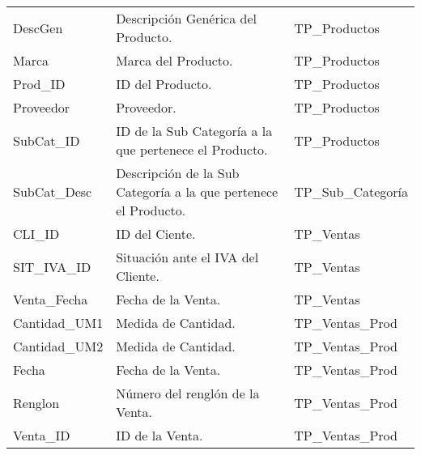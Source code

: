 \documentclass[]{article}
\begin{document}
\begin{itemize}
\begin{table}[]
\begin{tabular}{lll}
				DescGen                                & Descripción Genérica del Producto.                              & TP\_Productos                             \\
				Marca                                  & Marca del Producto.                                             & TP\_Productos                             \\
				Prod\_ID                               & ID del Producto.                                                & TP\_Productos                             \\
				Proveedor                              & Proveedor.                                                      & TP\_Productos                             \\
				SubCat\_ID                             & ID de la Sub Categoría a la que pertenece el Producto.          & TP\_Productos                             \\
				SubCat\_Desc                           & Descripción de la Sub Categoría a la que pertenece el Producto. & TP\_Sub\_Categoría                        \\
				CLI\_ID                                & ID del Ciente.                                                  & TP\_Ventas                                \\
				SIT\_IVA\_ID                           & Situación ante el IVA del Cliente.                              & TP\_Ventas                                \\
				Venta\_Fecha                           & Fecha de la Venta.                                              & TP\_Ventas                                \\
				Cantidad\_UM1                          & Medida de Cantidad.                                             & TP\_Ventas\_Prod                          \\
				Cantidad\_UM2                          & Medida de Cantidad.                                             & TP\_Ventas\_Prod                          \\
				Fecha                                  & Fecha de la Venta.                                              & TP\_Ventas\_Prod                          \\
				Renglon                                & Número del renglón de la Venta.                                 & TP\_Ventas\_Prod                          \\
				Venta\_ID                              & ID de la Venta.                                                 & TP\_Ventas\_Prod                         
			\end{tabular}
		\end{table}
		

\end{itemize}
\end{document}
